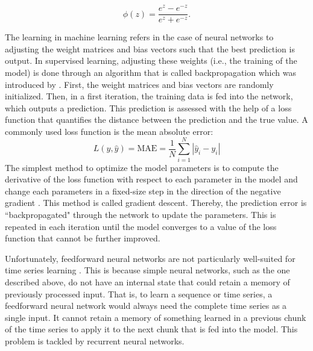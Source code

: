 \begin{equation} \label{Eq:activation}
    \phi(z)=\frac{e^z-e^{-z}}{e^z+e^{-z}}.
\end{equation}

The learning in machine learning refers in the case of neural networks to adjusting the weight matrices and bias vectors such that the best prediction is output. In supervised learning, adjusting these weights (i.e., the training of the model) is done through an algorithm that is called backpropagation which was introduced by \citet{Rumelhart:1986}. First, the weight matrices and bias vectors are randomly initialized. Then, in a first iteration, the training data is fed into the network, which outputs a prediction. This prediction is assessed with the help of a loss function that quantifies the distance between the prediction and the true value. A commonly used loss function is the mean absolute error:
%
\begin{equation} \label{Eq:lossMAE}
    L\left(y, \widehat{y}\right)=\text{MAE}=\frac{1}{N}\sum_{i=1}^N\left|\widehat{y}_i-y_i\right|
\end{equation}
%
The simplest method to optimize the model parameters is to compute the derivative of the loss function with respect to each parameter in the model and change each parameters in a fixed-size step in the direction of the negative gradient \citep{Graves:2013}. This method is called gradient descent. Thereby, the prediction error is ``backpropagated" through the network to update the parameters. This is repeated in each iteration until the model converges to a value of the loss function that cannot be further improved.




Unfortunately, feedforward neural networks are not particularly well-suited for time series learning \citep{Chollet:2018}. This is because simple neural networks, such as the one described above, do not have an internal state that could retain a memory of previously processed input. That is, to learn a sequence or time series, a feedforward neural network would always need the complete time series as a single input. It cannot retain a memory of something learned in a previous chunk of the time series to apply it to the next chunk that is fed into the model. This problem is tackled by recurrent neural networks.

